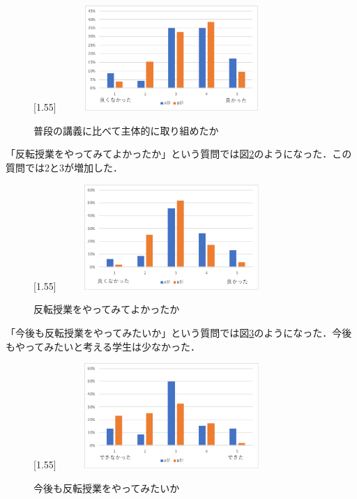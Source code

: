 \documentclass[a4j,11pt]{jsarticle}
\begin{document}
\begin{figure}[h]
\begin{center}
\scalebox{1.2}[1.55]{
 \includegraphics[clip,width=85mm,height=40mm]{anke9.pdf}
 }
\end{center}
 \caption{普段の講義に比べて主体的に取り組めたか}
 \label{anke9}
\end{figure}

「反転授業をやってみてよかったか」という質問では図\ref{anke10}のようになった．この質問では2と3が増加した．

\begin{figure}[h]
\begin{center}
\scalebox{1.2}[1.55]{
 \includegraphics[clip,width=85mm,height=40mm]{anke10.pdf}
 }
\end{center}
 \caption{反転授業をやってみてよかったか}
 \label{anke10}
\end{figure}

\newpage
「今後も反転授業をやってみたいか」という質問では図\ref{anke11}のようになった．今後もやってみたいと考える学生は少なかった．

\begin{figure}[h]
\begin{center}
\scalebox{1.2}[1.55]{
 \includegraphics[clip,width=85mm,height=40mm]{anke11.pdf}
 }
\end{center}
 \caption{今後も反転授業をやってみたいか}
 \label{anke11}
\end{figure}
\end{document}
